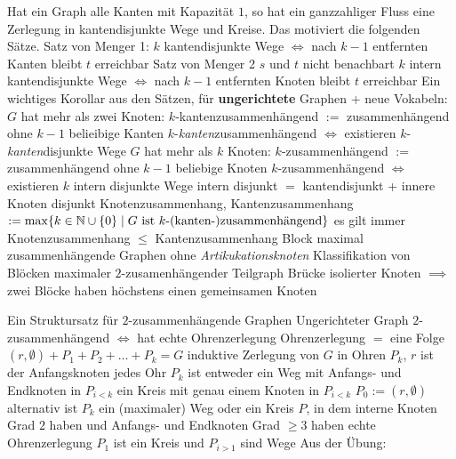 \begin{outline}
\0 Hat ein Graph alle Kanten mit Kapazität $1$, so hat ein ganzzahliger Fluss eine Zerlegung in kantendisjunkte Wege und Kreise. Das motiviert die folgenden Sätze.
    \1 Satz von Menger 1:
        \2  $k$ kantendisjunkte Wege $\iff$ nach $k-1$ entfernten Kanten bleibt $t$ erreichbar
    \1 Satz von Menger 2
        \2 $s$ und $t$ nicht benachbart
        \2 $k$ intern kantendisjunkte Wege $\iff$ nach $k-1$ entfernten Knoten bleibt $t$ erreichbar
\0 Ein wichtiges Korollar aus den Sätzen, für \textbf{ungerichtete} Graphen + neue Vokabeln:
    \1 $G$ hat mehr als zwei Knoten:
        \2 $k$-kantenzusammenhängend $:=$ zusammenhängend ohne $k-1$ belieibige Kanten
        \2 $k$-\textit{kanten}zusammenhängend $\iff$ existieren $k$-\textit{kanten}disjunkte Wege
    \1 $G$ hat mehr als $k$ Knoten:
        \2 $k$-zusammenhängend $:=$ zusammenhängend ohne $k-1$ beliebige Knoten
        \2 $k$-zusammenhängend $\iff$ existieren $k$ intern disjunkte Wege
            \3 intern disjunkt $=$ kantendisjunkt + innere Knoten disjunkt
    \1 Knotenzusammenhang, Kantenzusammenhang $:= \max \{k\in \mathbb{N} \cup \{0\} \mid G \text{ ist $k$-(kanten-)zusammenhängend}\}$
    \1 es gilt immer Knotenzusammenhang $\leq$ Kantenzusammenhang
    \1 Block 
        \2 maximal zusammenhängende Graphen ohne \textit{Artikukationsknoten}
        \2 Klassifikation von Blöcken
            \3 maximaler $2$-zusamenhängender Teilgraph
            \3 Brücke
            \3 isolierter Knoten
            \3 $\implies$ zwei Blöcke haben höchstens einen gemeinsamen Knoten

\0 Ein Struktursatz für $2$-zusammenhängende Graphen
    \1 Ungerichteter Graph $2$-zusammenhängend $\iff$ hat echte Ohrenzerlegung
        \2 Ohrenzerlegung $=$ eine Folge $(r, \emptyset) + P_1 + P_2 + \ldots + P_k = G$
            \3 induktive Zerlegung von $G$ in Ohren $P_k$, $r$ ist der Anfangsknoten
            \3 jedes Ohr $P_k$ ist entweder
                \4 ein Weg mit Anfangs- und Endknoten in $P_{i<k}$
                \4 ein Kreis mit genau einem Knoten in $P_{i<k}$
                \4 $P_0 := (r,\emptyset)$
            \3 alternativ ist $P_k$ ein (maximaler) Weg oder ein Kreis $P$, in dem interne Knoten Grad $2$ haben und Anfangs- und Endknoten Grad $\geq 3$ haben
        \2 echte Ohrenzerlegung
            \3 $P_1$ ist ein Kreis und $P_{i>1}$ sind Wege
    \1 Aus der Übung:
\end{outline}

